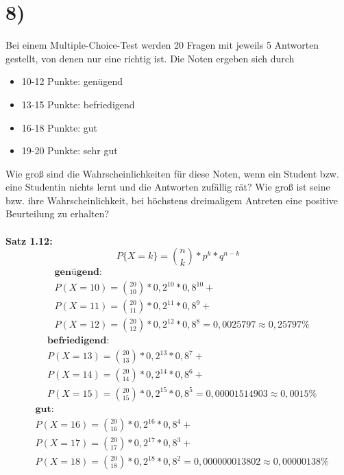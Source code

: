 	\newpage
	\section*{8)}
	Bei einem Multiple-Choice-Test werden 20 Fragen mit jeweils 5 Antworten gestellt, von denen nur eine richtig ist. Die Noten ergeben sich durch
  	\begin{itemize}
  		\item 10-12 Punkte: genügend
  		\item 13-15 Punkte: befriedigend
  		\item 16-18 Punkte: gut
  		\item 19-20 Punkte: sehr gut
  	\end{itemize}
  	Wie groß sind die Wahrscheinlichkeiten für diese Noten, wenn ein Student bzw. eine Studentin nichts lernt und die Antworten zufällig rät? Wie groß ist seine bzw. ihre Wahrscheinlichkeit, bei höchstens dreimaligem Antreten eine positive Beurteilung zu erhalten?\\
  	\\
  	\textbf{Satz 1.12:}\\
  	\[P\{X=k\} = \binom{n}{k} * p^k * q^{n-k} \]
  	\newline
  	\begin{align*}
  		& \textbf{genügend:} \\
  		& P(X=10) = \binom{20}{10} * 0,2^{10} * 0,8^{10} + \\
  		& P(X=11) = \binom{20}{11} * 0,2^{11} * 0,8^{9} + \\
  		& P(X=12) = \binom{20}{12} * 0,2^{12} * 0,8^{8} = 0,0025797 \approx 0,25797\%
  	\end{align*}
  	\begin{align*}
  		& \textbf{befriedigend:} \\
  		& P(X=13) = \binom{20}{13} * 0,2^{13} * 0,8^{7} + \\
  		& P(X=14) = \binom{20}{14} * 0,2^{14} * 0,8^{6} + \\
  		& P(X=15) = \binom{20}{15} * 0,2^{15} * 0,8^{5} = 0,00001514903 \approx 0,0015\%
  	\end{align*}
    \begin{align*}
  		& \textbf{gut:} \\
  		& P(X=16) = \binom{20}{16} * 0,2^{16} * 0,8^{4} + \\
  		& P(X=17) = \binom{20}{17} * 0,2^{17} * 0,8^{3} + \\
  		& P(X=18) = \binom{20}{18} * 0,2^{18} * 0,8^{2} = 0,000000013802 \approx 0,00000138\%
  	\end{align*}
